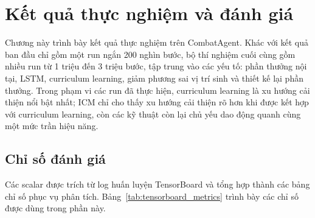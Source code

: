 \clearpage
{}

\setcounter{chapter}{3}
\chapter[{KẾT QUẢ THỰC NGHIỆM VÀ ĐÁNH GIÁ}]{Kết quả thực nghiệm và đánh giá}

Chương này trình bày kết quả thực nghiệm trên CombatAgent. Khác với kết quả ban đầu chỉ gồm một run ngắn 200 nghìn bước, bộ thí nghiệm cuối cùng gồm nhiều run từ 1 triệu đến 3 triệu bước, tập trung vào các yếu tố: phần thưởng nội tại, LSTM, curriculum learning, giảm phương sai vị trí sinh và thiết kế lại phần thưởng. Trong phạm vi các run đã thực hiện, curriculum learning là xu hướng cải thiện nổi bật nhất; ICM chỉ cho thấy xu hướng cải thiện rõ hơn khi được kết hợp với curriculum learning, còn các kỹ thuật còn lại chủ yếu dao động quanh cùng một mức trần hiệu năng.

\section{Chỉ số đánh giá}

Các scalar được trích từ log huấn luyện TensorBoard và tổng hợp thành các bảng chỉ số phục vụ phân tích. Bảng~\ref{tab:tensorboard_metrics} trình bày các chỉ số được dùng trong phần này.

